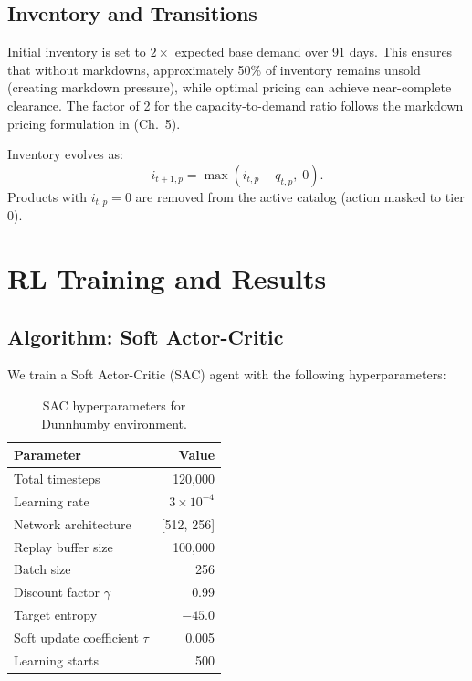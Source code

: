 \documentclass[11pt,a4paper]{article}
\begin{document}
\subsection{Inventory and Transitions}

Initial inventory is set to $2\times$ expected base demand over 91 days.
This ensures that without markdowns, approximately 50\% of inventory remains unsold (creating markdown pressure), while optimal pricing can achieve near-complete clearance.
The factor of 2 for the capacity-to-demand ratio follows the markdown pricing formulation in \citet{talluri2004} (Ch.\ 5).

Inventory evolves as:
\begin{equation}
i_{t+1,p} = \max\!\left(i_{t,p} - q_{t,p},\;0\right).
\end{equation}
Products with $i_{t,p} = 0$ are removed from the active catalog (action masked to tier 0).

\section{RL Training and Results}
\label{sec:results}

\subsection{Algorithm: Soft Actor-Critic}

We train a Soft Actor-Critic (SAC) agent \citep{haarnoja2018} with the following hyperparameters:

\begin{table}[H]
\centering
\caption{SAC hyperparameters for Dunnhumby environment.}
\begin{tabular}{@{}lr@{}}
\toprule
\textbf{Parameter} & \textbf{Value} \\
\midrule
Total timesteps & 120,000 \\
Learning rate & $3 \times 10^{-4}$ \\
Network architecture & [512, 256] \\
Replay buffer size & 100,000 \\
Batch size & 256 \\
Discount factor $\gamma$ & 0.99 \\
Target entropy & $-45.0$ \\
Soft update coefficient $\tau$ & 0.005 \\
Learning starts & 500 \\
\bottomrule
\end{tabular}
\end{table}
\end{document}
